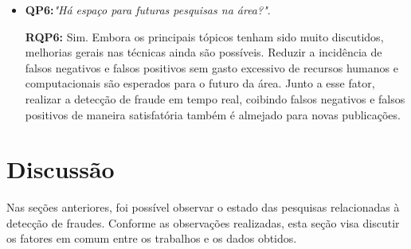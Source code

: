 \documentclass[smallextended]{svjour3}
\begin{document}
\begin{itemize}
	\
	\item \textbf{QP6:}\textit{"Há espaço para futuras pesquisas na área?"}.
	
	\textbf{RQP6:} Sim. Embora os principais tópicos tenham sido muito discutidos, melhorias gerais nas técnicas ainda são possíveis. Reduzir a incidência de falsos negativos e falsos positivos sem gasto excessivo de recursos humanos e computacionais são esperados para o futuro da área. Junto a esse fator, realizar a detecção de fraude em tempo real, coibindo falsos negativos e falsos positivos de maneira satisfatória também é almejado para novas publicações.
	
\end{itemize}

\section{Discussão}
\label{sec:5}

Nas seções anteriores, foi possível observar o estado das pesquisas relacionadas à detecção de fraudes. Conforme as observações realizadas, esta seção visa discutir os fatores em comum entre os trabalhos e os dados obtidos.
\end{document}
